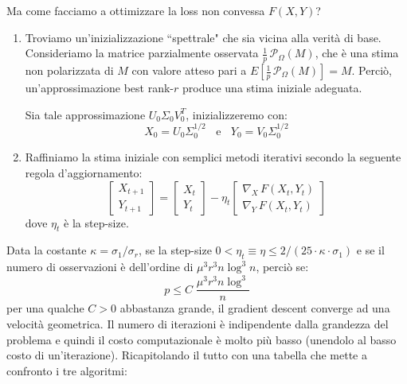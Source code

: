 \documentclass[12pt,a4paper]{report}
\begin{document}
Ma come facciamo a ottimizzare la loss non convessa $F(X,Y)$?
\begin{enumerate}
  \item Troviamo un'inizializzazione ``spettrale" che sia vicina alla verità di base.
  Consideriamo la matrice parzialmente osservata $\frac{1}{p}\,\mathcal{P}_{\Omega}(M)$,
  che è una stima non polarizzata di $M$ con valore atteso pari a
  $E[\frac{1}{p}\,\mathcal{P}_{\Omega}(M)] = M$.
  Perciò, un'approssimazione best rank-$r$ produce una stima iniziale adeguata.

  Sia tale approssimazione $U_0 \Sigma_0 V_0^T$, inizializzeremo con:
  $$ X_0 = U_0 \Sigma_0^{1/2} \;\; \text{ e } \;\; Y_0 = V_0 \Sigma_0^{1/2} $$
  \item Raffiniamo la stima iniziale con semplici metodi iterativi secondo la
  seguente regola d'aggiornamento:
  $$ \begin{bmatrix}
    X_{t+1}\\ 
    Y_{t+1}
    \end{bmatrix}
    =
    \begin{bmatrix}
    X_{t}\\ 
    Y_{t}
    \end{bmatrix}
    - \eta_t
    \begin{bmatrix}
    \nabla_X \, F(X_t, Y_t)\\ 
    \nabla_Y \, F(X_t, Y_t)
  \end{bmatrix} $$
  dove $\eta_t$ è la step-size.
\end{enumerate}
Data la costante $\kappa = \sigma_1/\sigma_r$,
se la step-size $0 < \eta_t \equiv \eta \leq 2 / (25\cdot\kappa\cdot\sigma_1)$
e se il numero di osservazioni è dell'ordine di $\mu^3 r^3 n \log^3 n$,
perciò se:
$$ p \leq C \; \frac{\mu^3 r^3 n \log^3}{n} $$
per una qualche $C>0$ abbastanza grande,
il gradient descent converge ad una velocità geometrica.
Il numero di iterazioni è indipendente dalla grandezza del problema e quindi
il costo computazionale è molto più basso (unendolo al basso costo di un'iterazione).
\newpage
Ricapitolando il tutto con una tabella che mette a confronto i tre algoritmi:
\end{document}
